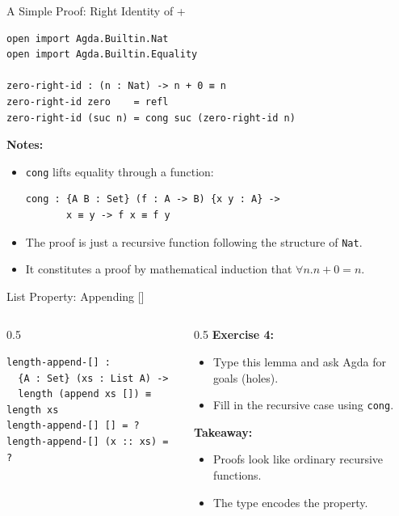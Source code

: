 \documentclass[aspectratio=169]{beamer}
\begin{document}
\begin{frame}[fragile]{A Simple Proof: Right Identity of +}
\begin{lstlisting}
open import Agda.Builtin.Nat
open import Agda.Builtin.Equality

zero-right-id : (n : Nat) -> n + 0 ≡ n
zero-right-id zero    = refl
zero-right-id (suc n) = cong suc (zero-right-id n)
\end{lstlisting}

  \textbf{Notes:}
  \begin{itemize}
    \item \texttt{cong} lifts equality through a function:
\begin{lstlisting}
cong : {A B : Set} (f : A -> B) {x y : A} ->
       x ≡ y -> f x ≡ f y
\end{lstlisting}
    \item The proof is just a recursive function following the
      structure of \texttt{Nat}.
    \item It constitutes a proof by mathematical induction that $\forall
      n. n + 0 = n$.
  \end{itemize}
\end{frame}

\begin{frame}[fragile]{List Property: Appending []}
\begin{columns}
  \begin{column}{0.5\textwidth}
\begin{lstlisting}
length-append-[] :
  {A : Set} (xs : List A) ->
  length (append xs []) ≡ length xs
length-append-[] [] = ?
length-append-[] (x :: xs) = ?
\end{lstlisting}
    
  \end{column}
  \begin{column}{0.5\textwidth}
    \textbf{Exercise 4:}
    \begin{itemize}
      \item Type this lemma and ask Agda for goals (holes).
      \item Fill in the recursive case using \texttt{cong}.
    \end{itemize}
    \vspace{1em}
    \textbf{Takeaway:}
    \begin{itemize}
      \item Proofs look like ordinary recursive functions.
      \item The type encodes the property.
    \end{itemize}
  \end{column}
\end{columns}
\end{frame}
\end{document}

